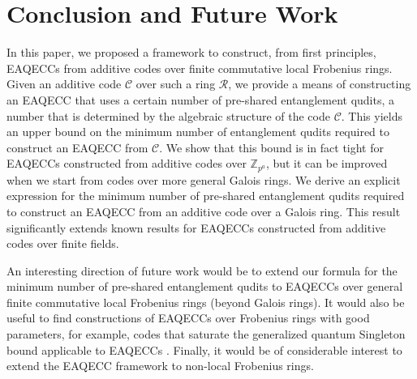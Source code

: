 \documentclass{article}
\theoremstyle{remark}
\theoremstyle{definition}
\numberwithin{equation}{section}
\begin{document}
\section{Conclusion and Future Work}\label{sec6}
In this paper, we proposed a framework to construct, from first principles, EAQECCs from additive codes over finite commutative local Frobenius rings. Given an additive code $\mathcal{C}$ over such a ring $\mathcal{R}$, we provide a means of constructing an EAQECC that uses a certain number of pre-shared entanglement qudits, a number that is determined by the algebraic structure of the code $\mathcal{C}$. This yields an upper bound on the minimum number of entanglement qudits required to construct an EAQECC from $\mathcal{C}$. We show that this bound is in fact tight for EAQECCs constructed from additive codes over $\mathbb{Z}_{p^a}$, but it can be improved when we start from codes over more general Galois rings. We derive an explicit expression for the minimum number of pre-shared entanglement qudits required to construct an EAQECC from an additive code over a Galois ring. This result significantly extends known results for EAQECCs constructed from additive codes over finite fields.

An interesting direction of future work would be to extend our formula for the minimum number of pre-shared entanglement qudits to EAQECCs over general finite commutative local Frobenius rings (beyond Galois rings). It would also be useful to find constructions of EAQECCs over Frobenius rings with good parameters, for example, codes that saturate the generalized quantum Singleton bound applicable to EAQECCs \cite{GHW21}. Finally, it would be of considerable interest to extend the EAQECC framework to non-local Frobenius rings.
\end{document}
